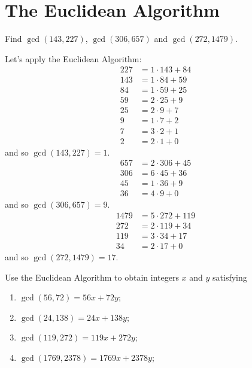 \section{The Euclidean Algorithm}

\begin{exercise}
    Find $\gcd(143, 227)$, $\gcd(306, 657)$ and $\gcd(272, 1479)$. \\
\end{exercise}

\begin{solution}
    Let's apply the Euclidean Algorithm:
    \begin{align*}
        227 &= 1\cdot 143 + 84 \\
        143 &= 1\cdot 84 + 59 \\
        84 &= 1\cdot 59 + 25 \\
        59 &= 2 \cdot 25 + 9 \\
        25 &= 2 \cdot 9 + 7 \\
        9 &= 1 \cdot 7 + 2 \\
        7 &= 3 \cdot 2 + 1 \\
        2 &= 2\cdot1 + 0
    \end{align*}
    and so $\gcd(143, 227) = 1$. 
    \begin{align*}
        657 &= 2\cdot 306 + 45 \\
        306 &= 6\cdot 45 + 36 \\
        45 &= 1\cdot 36 + 9 \\
        36 &= 4 \cdot 9 + 0
    \end{align*}
    and so $\gcd(306, 657) = 9$. 
    \begin{align*}
        1479 &= 5\cdot 272 + 119 \\
        272 &= 2\cdot 119 + 34 \\
        119 &= 3\cdot 34 + 17 \\
        34 &= 2 \cdot 17 + 0
    \end{align*}
    and so $\gcd(272, 1479) = 17$. \\ 
\end{solution}

\begin{exercise}
    Use the Euclidean Algorithm to obtain integers $x$ and $y$ satisfying 
    \begin{enumerate}
        \item $\gcd(56, 72) = 56 x + 72 y$;
        \item $\gcd(24, 138) = 24 x + 138 y$;
        \item $\gcd(119, 272) = 119 x + 272 y$;
        \item $\gcd(1769, 2378) = 1769 x + 2378 y$;
    \end{enumerate}
\end{exercise}

